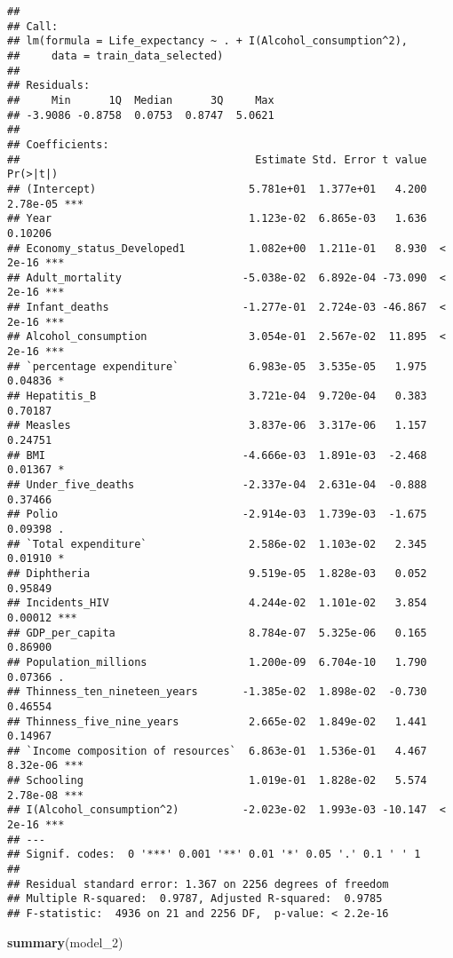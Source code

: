 \documentclass[
]{article}
\newenvironment{Shaded}{\begin{snugshade}}{\end{snugshade}}
\newcommand{\FunctionTok}[1]{\textcolor[rgb]{0.13,0.29,0.53}{\textbf{#1}}}
\newcommand{\NormalTok}[1]{#1}
\begin{document}
\begin{verbatim}
## 
## Call:
## lm(formula = Life_expectancy ~ . + I(Alcohol_consumption^2), 
##     data = train_data_selected)
## 
## Residuals:
##     Min      1Q  Median      3Q     Max 
## -3.9086 -0.8758  0.0753  0.8747  5.0621 
## 
## Coefficients:
##                                     Estimate Std. Error t value Pr(>|t|)    
## (Intercept)                        5.781e+01  1.377e+01   4.200 2.78e-05 ***
## Year                               1.123e-02  6.865e-03   1.636  0.10206    
## Economy_status_Developed1          1.082e+00  1.211e-01   8.930  < 2e-16 ***
## Adult_mortality                   -5.038e-02  6.892e-04 -73.090  < 2e-16 ***
## Infant_deaths                     -1.277e-01  2.724e-03 -46.867  < 2e-16 ***
## Alcohol_consumption                3.054e-01  2.567e-02  11.895  < 2e-16 ***
## `percentage expenditure`           6.983e-05  3.535e-05   1.975  0.04836 *  
## Hepatitis_B                        3.721e-04  9.720e-04   0.383  0.70187    
## Measles                            3.837e-06  3.317e-06   1.157  0.24751    
## BMI                               -4.666e-03  1.891e-03  -2.468  0.01367 *  
## Under_five_deaths                 -2.337e-04  2.631e-04  -0.888  0.37466    
## Polio                             -2.914e-03  1.739e-03  -1.675  0.09398 .  
## `Total expenditure`                2.586e-02  1.103e-02   2.345  0.01910 *  
## Diphtheria                         9.519e-05  1.828e-03   0.052  0.95849    
## Incidents_HIV                      4.244e-02  1.101e-02   3.854  0.00012 ***
## GDP_per_capita                     8.784e-07  5.325e-06   0.165  0.86900    
## Population_millions                1.200e-09  6.704e-10   1.790  0.07366 .  
## Thinness_ten_nineteen_years       -1.385e-02  1.898e-02  -0.730  0.46554    
## Thinness_five_nine_years           2.665e-02  1.849e-02   1.441  0.14967    
## `Income composition of resources`  6.863e-01  1.536e-01   4.467 8.32e-06 ***
## Schooling                          1.019e-01  1.828e-02   5.574 2.78e-08 ***
## I(Alcohol_consumption^2)          -2.023e-02  1.993e-03 -10.147  < 2e-16 ***
## ---
## Signif. codes:  0 '***' 0.001 '**' 0.01 '*' 0.05 '.' 0.1 ' ' 1
## 
## Residual standard error: 1.367 on 2256 degrees of freedom
## Multiple R-squared:  0.9787, Adjusted R-squared:  0.9785 
## F-statistic:  4936 on 21 and 2256 DF,  p-value: < 2.2e-16
\end{verbatim}

\begin{Shaded}
\begin{Highlighting}[]
\FunctionTok{summary}\NormalTok{(model\_2)}
\end{Highlighting}
\end{Shaded}
\end{document}
